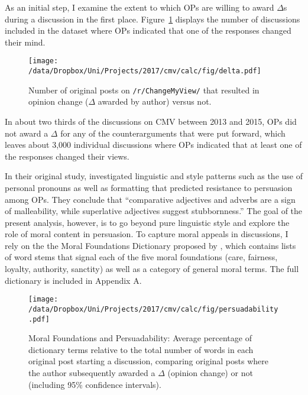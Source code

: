 As an initial step, I examine the extent to which OPs are willing to award $\Delta$s during a discussion in the first place. Figure~\ref{fig:delta} displays the number of discussions included in the dataset where OPs indicated that one of the responses changed their mind.

\begin{figure}[ht]
\centering
\texttt{[image: /data/Dropbox/Uni/Projects/2017/cmv/calc/fig/delta.pdf]}
\caption{Number of original posts on \texttt{/r/ChangeMyView/} that resulted in opinion change ($\Delta$ awarded by author) versus not.}\label{fig:delta}
\end{figure}

In about two thirds of the discussions on CMV between 2013 and 2015, OPs did not award a $\Delta$ for any of the counterarguments that were put forward, which leaves about 3,000 individual discussions where OPs indicated that at least one of the responses changed their views.

In their original study, \citet{tan2016winning} investigated linguistic and style patterns such as the use of personal pronouns as well as formatting that predicted resistance to persuasion among OPs. They conclude that ``comparative adjectives and adverbs are a sign of malleability, while superlative adjectives suggest stubbornness.'' The goal of the present analysis, however, is to go beyond pure linguistic style and explore the role of moral content in persuasion. To capture moral appeals in discussions, I rely on the the Moral Foundations Dictionary proposed by \citet{graham2009liberals}, which contains lists of word stems that signal each of the five moral foundations (care, fairness, loyalty, authority, sanctity) as well as a category of general moral terms. The full dictionary is included in Appendix A.

\begin{figure}[ht]
\centering
\texttt{[image: /data/Dropbox/Uni/Projects/2017/cmv/calc/fig/persuadability.pdf]}
\caption[Moral Foundations and Persuadability]{Moral Foundations and Persuadability: Average percentage of dictionary terms relative to the total number of words in each original post starting a discussion, comparing original posts where the author subsequently awarded a $\Delta$ (opinion change) or not (including 95\% confidence intervals).}\label{fig:persuadability}
\end{figure}

